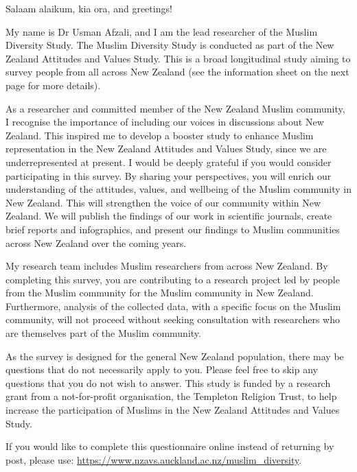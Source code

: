 \documentclass[
]{interact}
\begin{document}
\noindent Salaam alaikum, kia ora, and greetings!

\noindent My name is Dr Usman Afzali, and I am the lead researcher of
the Muslim Diversity Study. The Muslim Diversity Study is conducted as
part of the New Zealand Attitudes and Values Study. This is a broad
longitudinal study aiming to survey people from all across New Zealand
(see the information sheet on the next page for more details).

\noindent As a researcher and committed member of the New Zealand Muslim
community, I recognise the importance of including our voices in
discussions about New Zealand. This inspired me to develop a booster
study to enhance Muslim representation in the New Zealand Attitudes and
Values Study, since we are underrepresented at present. I would be
deeply grateful if you would consider participating in this survey. By
sharing your perspectives, you will enrich our understanding of the
attitudes, values, and wellbeing of the Muslim community in New Zealand.
This will strengthen the voice of our community within New Zealand. We
will publish the findings of our work in scientific journals, create
brief reports and infographics, and present our findings to Muslim
communities across New Zealand over the coming years.

\noindent My research team includes Muslim researchers from across New
Zealand. By completing this survey, you are contributing to a research
project led by people from the Muslim community for the Muslim community
in New Zealand. Furthermore, analysis of the collected data, with a
specific focus on the Muslim community, will not proceed without seeking
consultation with researchers who are themselves part of the Muslim
community.

\noindent As the survey is designed for the general New Zealand
population, there may be questions that do not necessarily apply to you.
Please feel free to skip any questions that you do not wish to answer.
This study is funded by a research grant from a not-for-profit
organisation, the Templeton Religion Trust, to help increase the
participation of Muslims in the New Zealand Attitudes and Values Study.

\begin{tcolorbox}[enhanced jigsaw, left=2mm, opacityback=0, toprule=.15mm, leftrule=.75mm, colframe=quarto-callout-color-frame, arc=.35mm, bottomrule=.15mm, breakable, colback=white, rightrule=.15mm]

If you would like to complete this questionnaire online instead of
returning by post, please use:
\url{https://www.nzavs.auckland.ac.nz/muslim_diversity}.

\end{tcolorbox}
\end{document}
